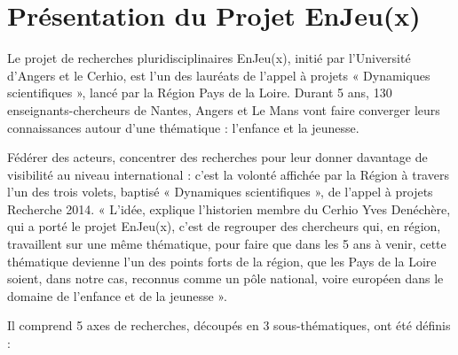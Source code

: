 \section{Présentation du Projet EnJeu(x)}

Le projet de recherches pluridisciplinaires EnJeu(x), initié par l'Université d'Angers et le Cerhio, est l'un des lauréats de l'appel à projets « Dynamiques scientifiques », lancé par la Région Pays de la Loire. Durant 5 ans, 130 enseignants-chercheurs de Nantes, Angers et Le Mans vont faire converger leurs connaissances autour d'une thématique : l'enfance et la jeunesse.

Fédérer des acteurs, concentrer des recherches pour leur donner davantage de visibilité au niveau international : c'est la volonté affichée par la Région à travers l'un des trois volets, baptisé « Dynamiques scientifiques », de l'appel à projets Recherche 2014. « L'idée, explique l'historien membre du Cerhio Yves Denéchère, qui a porté le projet EnJeu(x), c'est de regrouper des chercheurs qui, en région, travaillent sur une même thématique, pour faire que dans les 5 ans à venir, cette thématique devienne l'un des points forts de la région, que les Pays de la Loire soient, dans notre cas, reconnus comme un pôle national, voire européen dans le domaine de l'enfance et de la jeunesse ».

Il comprend 5 axes de recherches, découpés en 3 sous-thématiques, ont été définis :

